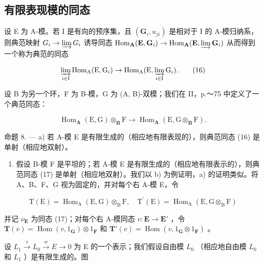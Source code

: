 \subsection{有限表现模的同态}

设 E 为 A-模。若 I 是有向的预序集，且 \((\mathbf{G}_{i}, u_{ji})\) 是相对于 I 的 A-模归纳系，则典范映射 \(G_{i} \to \varinjlim G_{i}\) 诱导同态 \(\operatorname{Hom}_{\mathbf{A}}(\mathbf{E}, \mathbf{G}_{i}) \to \operatorname{Hom}_{\mathbf{A}}(\mathbf{E}, \varinjlim \mathbf{G}_{i})\) 从而得到一个称为典范的同态

\[
\varinjlim_ {i \in \mathrm{I}} \operatorname{Hom} _ {\mathrm{A}} (\mathrm{E}, \mathrm{G} _ {i}) \rightarrow \operatorname{Hom} _ {\mathrm{A}} (\mathrm{E}, \varinjlim_ {i \in \mathrm{I}} \mathrm{G} _ {i}).\tag{16}
\]

设 B 为另一个环，F 为 B-模，G 为 (A, B)-双模；我们在 II，p.～75 中定义了一个典范同态：

\[
\operatorname{Hom} _ {\mathbf {A}} (\mathrm{E}, \mathrm{G}) \otimes_ {\mathbf {B}} \mathrm{F} \rightarrow \operatorname{Hom} _ {\mathbf {A}} (\mathrm{E}, \mathrm{G} \otimes_ {\mathbf {B}} \mathrm{F}).\tag{17}
\]

命题 8. --- a) 若 A-模 E 是有限生成的（相应地有限表现的），则典范同态 (16) 是单射（相应地双射）。

\begin{enumerate}
\def\labelenumi{\alph{enumi})}
\setcounter{enumi}{1}
\tightlist
\item
  假设 B-模 F 是平坦的；若 A-模 E 是有限生成的（相应地有限表示的），则典范同态 (17) 是单射（相应地双射）。我们以 b) 为例证明，a) 的证明类似。将 A、B、F、G 视为固定的，并对每个右 A-模 E，令
\end{enumerate}

\[
\mathrm{T} (\mathrm{E}) = \operatorname{Hom} _ {\mathrm{A}} (\mathrm{E}, \mathrm{G}) \otimes_ {\mathrm{B}} \mathrm{F}, \quad \mathrm{T} ^ {\prime} (\mathrm{E}) = \operatorname{Hom} _ {\mathrm{A}} (\mathrm{E}, \mathrm{G} \otimes_ {\mathrm{B}} \mathrm{F})
\]

并记 \(\nu_{\mathbf{E}}\) 为同态 (17)；对每个右 A-模同态 \(v: \mathbf{E} \to \mathbf{E}'\) ，令 \(\mathbf{T}(v) = \operatorname{Hom}(v, 1_{\mathbf{G}}) \otimes 1_{\mathbf{F}}\) 和 \(\mathbf{T}'(v) = \operatorname{Hom}(v, 1_{\mathbf{G}} \otimes 1_{\mathbf{F}})\) 。

设 \(L_{1} \xrightarrow{v} L_{0} \xrightarrow{w} E \to 0\) 为 E 的一个表示；我们假设自由模 \(L_{0}\) （相应地自由模 \(L_{0}\) 和 \(L_{1}\) ）是有限生成的。图

